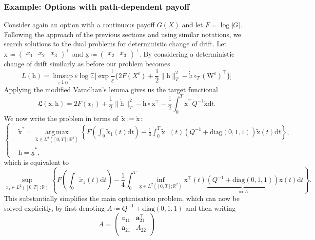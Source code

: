 \documentclass{amsart}[11pt]
\numberwithin{equation}{section}
\numberwithin{theorem}{subsection}
\numberwithin{proposition}{subsection}
\numberwithin{definition}{subsection}
\numberwithin{lemma}{subsection}
\numberwithin{assumption}{subsection}
\newcommand{\RR}{\mathbb{R}}
\newcommand{\Lf}{\mathfrak{L}}
\newcommand{\EE}{\mathbb{E}}
\newcommand{\cT}{\circ_{T}}
\newcommand{\Wf}{\boldsymbol{\mathrm{W}}}
\newcommand{\D}{\mathrm{d}}
\newcommand{\eps}{\varepsilon}
\newcommand{\hh}{\boldsymbol{\mathrm{h}}}
\newcommand{\xx}{\boldsymbol{\mathrm{x}}}
\DeclareMathOperator*{\argmax}{arg\,max}
\begin{document}
\subsubsection{Example: Options with path-dependent payoff}
Consider again an option with a continuous payoff $G(X)$ and let $F=\log|G|$. Following the approach of the previous sections and using similar notations, we search solutions to the dual problems for deterministic change of drift.
Let 
$\xx \coloneqq \begin{pmatrix}x_1& x_2& x_3\end{pmatrix}^\top$ and 
$\underline{\xx}\coloneqq \begin{pmatrix}x_2 &  x_3\end{pmatrix}^\top$. 
By considering a deterministic change of drift similarly as before our problem becomes 
\[
L(\hh) = \limsup\limits_{\eps \downarrow 0} \eps\log\EE\Big[\exp\frac{1}{\eps}\Big\{
2F(X^\eps) +\frac{1}{2}\|\dot{\hh}\|^2_T - \dot{\hh}\cT({\Wf^\eps})^\top\Big\}\Big]
\]
Applying the modified Varadhan's lemma gives us the 
target functional
$$
\Lf(\xx,\hh) = 2F(x_1) + \frac{1}{2}\|\dot{\hh}\|^2_T - \dot{\hh}\circ\underline{\xx}^\top - \frac{1}{2}\int_0^T\dot{\xx}^\top Q^{-1} \dot{\xx} \D t.
$$
We now write the problem in terms of~$\widetilde{\xx}:=\dot{\xx}\,$:
$$
\begin{cases}
& \displaystyle \widetilde{\xx}^{*}  =  \argmax\limits_{\widetilde{\xx} \in L^2([0,T]; \RR^3)}
\left\{F\left(\int_{0}^{\cdot} \widetilde x_1(t) \D t\right) - \frac{1}{4}\int_0^T \widetilde{\xx}^\top(t) \left( Q^{-1} + \mathrm{diag}(0,1,1) \right )\widetilde{\xx}(t) \D t\right\}, \\
& \displaystyle \dot{\hh} = \widetilde{\underline{\xx}}^{*},
\end{cases}
$$
which is equivalent to
\begin{equation}\label{eq:SupInfInt}
\sup\limits_{x_1\in L^2([0,T]; \RR)}\left \{F\left(\int_{0}^{\cdot} \widetilde x_1(t) \D t\right) - \frac{1}{4}\int_0^T \inf_{\underline{\xx}\in L^2([0,T]; \RR^2)} \xx^\top(t) \underbrace{\left( Q^{-1} + \mathrm{diag}(0,1,1) \right )}_{\eqqcolon A}\xx(t) \D t \right \}.
\end{equation}
This substantially simplifies the main optimisation problem, which can now be solved explicitly, by first denoting $A \coloneqq Q^{-1} + \mathrm{diag}(0,1,1)$ and then writing 
\[
A =
\begin{pmatrix}
a_{11} & \mathbf a_{21}^\top\\
\mathbf a_{21} &A_{22}\\
\end{pmatrix}
\]
\end{document}
